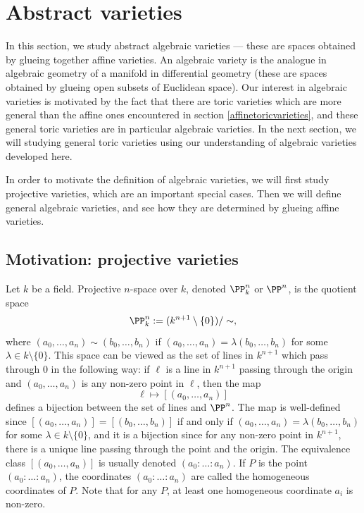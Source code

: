 \documentclass[12pt]{amsart}
\theoremstyle{plain}
\begin{document}
\newpage
{}
\section{Abstract varieties}
In this section, we study abstract algebraic varieties --- these are spaces obtained by glueing together affine varieties.
An algebraic variety is the analogue in algebraic geometry of a manifold in differential geometry (these are spaces obtained by glueing open subsets of Euclidean space).
Our interest in algebraic varieties is motivated by the fact that there are toric varieties which are more general than the affine ones encountered in section \ref{affinetoricvarieties}, and these general toric varieties are in particular algebraic varieties. 
In the next section, we will studying general toric varieties using our understanding of algebraic varieties developed here.

In order to motivate the definition of algebraic varieties, we will first study projective varieties, which are an important special cases.
Then we will define general algebraic varieties, and see how they are determined by glueing affine varieties.





\subsection{Motivation: projective varieties}
Let $k$ be a field.
Projective $n$-space over $k$, denoted $\PP^n_k$ or $\PP^n$, is the quotient space
$$\PP^n_k := (k^{n+1} \setminus \{0\}) / \sim,$$
where $(a_0, \ldots, a_{n}) \sim (b_0, \ldots, b_{n})$ if $(a_0, \ldots, a_n) = \lambda (b_0, \ldots, b_n)$ for some $\lambda \in k \setminus \{0\}$.
This space can be viewed as the set of lines in $k^{n+1}$ which pass through $0$ in the following way:
if $\ell$ is a line in $k^{n+1}$ passing through the origin and $(a_0, \ldots, a_n)$ is any non-zero point in $\ell$, then the map
$$\ell \mapsto [(a_0, \ldots, a_n)]$$
defines a bijection between the set of lines and $\PP^n$.
The map is well-defined since $[(a_0, \ldots, a_n)] = [(b_0, \ldots, b_n)]$ if and only if $(a_0, \ldots, a_n) = \lambda (b_0, \ldots, b_n)$ for some $\lambda \in k \setminus \{0\}$, and it is a bijection since for any non-zero point in $k^{n+1}$, there is a unique line passing through the point and the origin.
The equivalence class $[(a_0, \ldots, a_n)]$ is usually denoted $(a_0 : \ldots : a_n)$.
If $P$ is the point $(a_0 : \ldots : a_n)$, the coordinates $(a_0 : \ldots : a_n)$ are called the homogeneous coordinates of $P$. 
Note that for any $P$, at least one homogeneous coordinate $a_i$ is non-zero.
\end{document}
